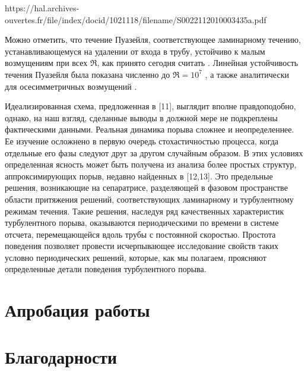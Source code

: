 https://hal.archives-ouvertes.fr/file/index/docid/1021118/filename/S0022112010003435a.pdf

Можно отметить, что течение Пуазейля, соответствующее ламинарному течению, устанавливающемуся на удалении от входа в трубу, устойчиво к малым возмущениям при всех $\Re$, как принято сегодня считать \cite{Kerswell2005}. Линейная устойчивость течения Пуазейля была показана численно до $\Re=10^7$ \cite{Meseguer2003}, а также аналитически для осесимметричных возмущений \cite{Salwen1980}. 

Идеализированная схема, предложенная в [11], выглядит вполне правдоподобно, однако, на наш взгляд, сделанные выводы в должной мере не подкреплены фактическими данными. Реальная динамика порыва сложнее и неопределеннее. Ее изучение осложнено в первую очередь стохастичностью процесса, когда отдельные его фазы следуют друг за другом случайным образом. В этих условиях определенная ясность может быть получена из анализа более простых структур, аппроксимирующих порыв, недавно найденных в [12,13]. Это предельные решения, возникающие на сепаратрисе, разделяющей в фазовом пространстве области притяжения решений, соответствующих ламинарному и турбулентному режимам течения. Такие решения, наследуя ряд качественных характеристик турбулентного порыва, оказываются периодическими по времени в системе отсчета, перемещающейся вдоль трубы с постоянной скоростью. Простота поведения позволяет провести исчерпывающее исследование свойств таких условно периодических решений, которые, как мы полагаем, проясняют определенные детали поведения турбулентного порыва.

\section{Апробация работы}

\section{Благодарности}



